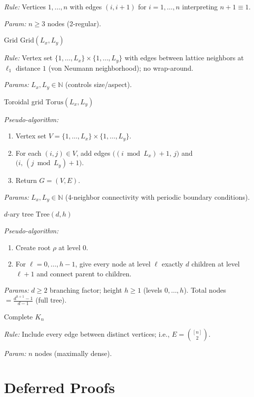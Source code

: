 \documentclass[twoside,11pt]{article}
\numberwithin{equation}{section}
\numberwithin{theorem}{section}
\numberwithin{example}{section}
\begin{document}
\begin{description}
\emph{Rule:} Vertices $1,\dots,n$ with edges $(i,i+1)$ for $i=1,\dots,n$ interpreting $n+1\equiv 1$.

\emph{Param:} $n\ge 3$ nodes (2-regular).

\item[]\textsf{Grid} $\mathrm{Grid}(L_x,L_y)$

\emph{Rule:} Vertex set $\{1,\dots,L_x\}\times \{1,\dots,L_y\}$ with edges between lattice neighbors at $\ell_1$ distance $1$ (von Neumann neighborhood); no wrap-around.

\emph{Params:} $L_x,L_y\in\mathbb{N}$ (controls size/aspect). 


\item[]\textsf{Toroidal grid} $\mathrm{Torus}(L_x,L_y)$

 \emph{Pseudo-algorithm:}
 \begin{enumerate}
 \item Vertex set $V=\{1,\dots,L_x\}\times\{1,\dots,L_y\}$.
 \item For each $(i,j)\in V$, add edges
   \(
   \bigl((i \bmod L_x)+1,\, j\bigr)\) and \(\bigl(i,\, (j \bmod L_y)+1\bigr).
   \)
 \item Return $G=(V,E)$.
 \end{enumerate}
 \emph{Params:} $L_x,L_y\in\mathbb{N}$ (4-neighbor connectivity with periodic boundary conditions).

\item[]\textsf{$d$-ary tree} $\mathrm{Tree}(d,h)$

\emph{Pseudo-algorithm:}
\begin{enumerate}
\item Create root $\rho$ at level $0$.
\item For $\ell=0,\dots,h-1$, give every node at level $\ell$ exactly $d$ children at level $\ell{+}1$ and connect parent to children.
\end{enumerate}
\emph{Params:} $d\ge 2$ branching factor; height $h\ge 1$ (levels $0,\dots,   h$).
Total nodes $=\tfrac{d^{h+1}-1}{d-1}$ (full tree).

\item[]\textsf{Complete} $K_n$

\emph{Rule:} Include every edge between distinct vertices; i.e., $E=\binom{[n]}{2}$.

\emph{Param:} $n$ nodes (maximally dense).
\end{description}

\section{Deferred Proofs}
\label{appendix:proofs}
\end{document}
